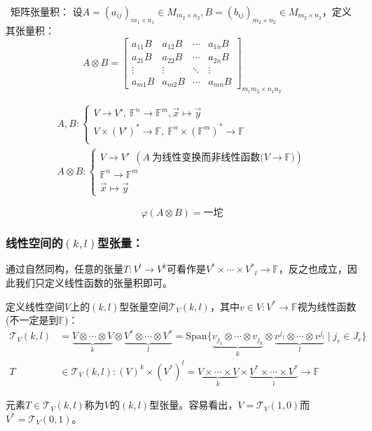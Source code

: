 \documentclass[zihao=5,UTF8]{report}
\def\F{\mathbb{F}}
\theoremstyle{mystyle} %
\begin{document}
\ 矩阵张量积：
设$A=(a_{ij})_{m_1\times n_1}\in M_{m_2\times n_2},B=(b_{ij})_{m_2\times n_2}\in M_{m_2\times n_2}$，定义其张量积：
\begin{equation*}
    A \otimes B = 
    \begin{bmatrix}  
        a_{11}B& a_{12}B& \cdots  & a_{1n}B \\  
        a_{21}B& a_{22}B& \cdots  & a_{2n}B \\  
        \vdots & \vdots & \ddots & \vdots \\  
        a_{m1}B& a_{m2}B& \cdots  & a_{mn}B  
    \end{bmatrix}_{m_1m_2\times n_1n_2}
\end{equation*}
{\par\color{gray}\small
\begin{align*}
    A,B: \begin{cases}
        V \longrightarrow V',\ \F^n \longrightarrow \F^m, \vec{x} \longmapsto \vec{y}\\
        V\times (V')^* \longrightarrow \F,\ \F^n \times (\F^m)^* \longrightarrow \F\\
    \end{cases}\\
    A\otimes B: \begin{cases}
        V \longrightarrow V'\ \ (A\ \text{为线性变换而非线性函数($V \longrightarrow \F$)}) \\
        \F^n \longrightarrow \F^m \\
        \vec{x} \longmapsto \vec{y}
    \end{cases}
\end{align*}
\par}
\begin{equation*}
    \varphi(A\otimes B) = \text{一坨}
\end{equation*}
\subsubsection{线性空间的$(k,l)$型张量：}
通过自然同构，任意的张量$T: V^l \longrightarrow V^k$可看作是${V^*\times\cdots\times V^*}_l \longrightarrow \F$，反之也成立，因此我们只定义线性函数的张量积即可。\par
定义线性空间$V$上的$(k,l)$型张量空间$\mathscr{T}_V(k, l)$，其中$v \in V : V^* \longrightarrow \F$视为线性函数(不一定是到$\F$)：
\begin{align*}
    \mathscr{T}_V(k, l) 
    & = \underbrace{V\otimes\cdots\otimes V}_k\otimes\underbrace{V^*\otimes\cdots\otimes V^*}_l 
    =\text{Span}\{\underbrace{v_{j_1} \otimes\cdots \otimes v_{j_k}}_k\otimes \underbrace{v^{j_1} \otimes\cdots \otimes v^{j_l}}_l\mid j_{r} \in J_{r}\} \\
    T &\in \mathscr{T}_V(k, l): (V)^k \times (V^*)^l = \underbrace{V\times\cdots\times V}_k\times\underbrace{V^*\times\cdots\times V^*}_l \longrightarrow \F
\end{align*}
{\par\color{gray}\small
元素$T\in \mathscr{T}_V(k, l)$称为$V$的$(k,l)$型张量。容易看出，$V = \mathscr{T}_V(1,0)$而$V^* = \mathscr{T}_V(0,1)$。
\par}
\end{document}
